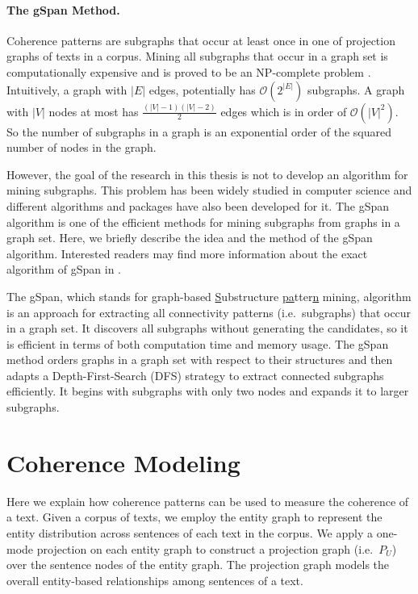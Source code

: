 \paragraph{The gSpan Method.}
%
Coherence patterns are subgraphs that occur at least once in one of projection graphs of texts in a corpus. 
Mining all subgraphs that occur in a graph set is computationally expensive and is proved to be an NP-complete problem \cite{althaus04}. 
Intuitively, a graph with $|E|$ edges, potentially has $\mathcal{O} \left( 2^{| E |} \right)$ subgraphs.  
A graph with $| V |$ nodes at most has  $\frac{(| V |-1)(| V |-2)}{2}$ edges which is in order of $\mathcal{O} \left( | V | ^2 \right)$. 
So the number of subgraphs in a graph is an exponential order of the squared number of nodes in the graph. 

However, the goal of the research in this thesis is not to develop an algorithm for mining subgraphs.  
This problem has been widely studied in computer science and different algorithms and packages have also been developed for it. 
The gSpan algorithm \cite{yanxifeng02} is one of the efficient methods for mining subgraphs from graphs in a graph set. 
Here, we briefly describe the idea and the method of the gSpan algorithm.  
Interested readers may find more information about the exact algorithm of gSpan in . 

The gSpan, which stands for \underline{g}raph-based \underline{S}ubstructure \underline{pa}tter\underline{n} mining, algorithm is an approach for extracting all connectivity patterns (i.e.\ subgraphs) that occur in a graph set. 
It discovers all subgraphs without generating the candidates, so
it is efficient in terms of both computation time and memory usage. 
The gSpan method orders graphs in a graph set with respect to their structures and then adapts a Depth-First-Search (DFS)  strategy to extract connected subgraphs efficiently. 
It begins with subgraphs with only two nodes and expands it to larger subgraphs. 


\section{Coherence Modeling}
\label{sec:coh-modeling}

Here we explain how coherence patterns can be used to measure the coherence of a text. 
Given a corpus of texts, we employ the entity graph to represent the entity distribution across sentences of each text in the corpus. 
We apply a one-mode projection on each entity graph to construct a projection graph (i.e.\ $P_U$) over the sentence nodes of the entity graph. 
The projection graph models the overall entity-based relationships among sentences of a text.  


